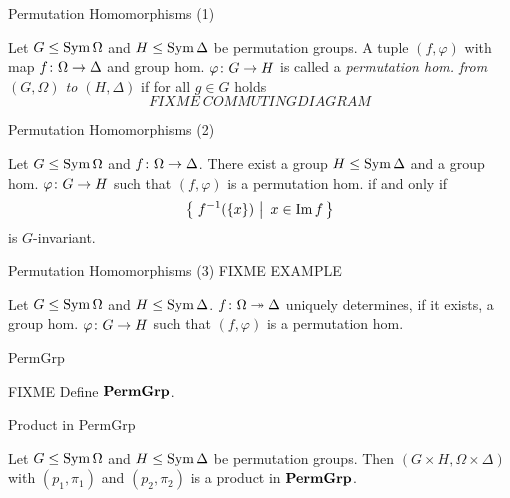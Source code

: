 \begin{frame}{Permutation Homomorphisms (1)}
   \begin{defn}
       Let $G \leq \operatorname{Sym} \Omega$ and $H \leq \operatorname{Sym} \Delta$ be permutation groups.
       A tuple
       $(f, \varphi)$
       with
       map $f \colon \Omega \rightarrow \Delta$
       and
       group hom.
       $\varphi \colon G \rightarrow H$
       is called a
       \emph{%
       permutation hom. from $(G, \Omega)$ to $(H, \Delta)$
       }
       if for all $g \in G$ holds
       \[
           FIXME ~COMMUTING DIAGRAM
       \]
   \end{defn}
\end{frame}

\begin{frame}{Permutation Homomorphisms (2)}
    \begin{lemma}
        Let $G \leq \operatorname{Sym} \Omega$ and $f \colon \Omega \rightarrow \Delta$.
        There exist a group $H \leq \operatorname{Sym} \Delta$
        and a group hom. $\varphi \colon G \rightarrow H$ such that
        $(f, \varphi)$ is a permutation hom.
        if and only if
        \[
             \left\{ \left.\,  f ^ {-1}( \left\{ x \right\} )  ~\right|~  x \in \operatorname{Im} f  \,\right\} 
        \]
        is $G$-invariant.
    \end{lemma}
\end{frame}

\begin{frame}{Permutation Homomorphisms (3)}
    FIXME EXAMPLE

    \begin{rem}
        Let $G \leq \operatorname{Sym} \Omega$ and $H \leq \operatorname{Sym} \Delta$.
        $f \colon \Omega \twoheadrightarrow \Delta$ uniquely determines,
        if it exists,
        a group hom. $\varphi \colon G \rightarrow H$ such that
        $(f, \varphi)$
        is a permutation hom.
    \end{rem}
\end{frame}

\begin{frame}{PermGrp}
    \begin{defn}
        FIXME Define $\mathbf{PermGrp}$.
    \end{defn}
\end{frame}


\begin{frame}{Product in PermGrp}
    \begin{lemma}
        Let $G \leq \operatorname{Sym} \Omega$ and $H \leq \operatorname{Sym} \Delta$ be permutation
        groups.
        Then $(G \times H, \Omega \times \Delta)$ with
        $(p_1, \pi_1)$ and $(p_2, \pi_2)$ is a product in $\mathbf{PermGrp}$.
    \end{lemma}
\end{frame}

